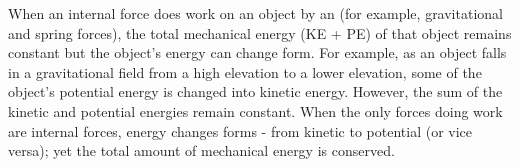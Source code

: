 
%

When an internal force does work on an object by an (for example, gravitational and spring forces), the total mechanical energy (KE + PE) of that object remains constant but the object's energy can change form. For example, as an object falls in a gravitational field from a high elevation to a lower elevation, some of the object's potential energy is changed into kinetic energy. However, the sum of the kinetic and potential energies remain constant. When the only forces doing work are internal forces, energy changes forms - from kinetic to potential (or vice versa); yet the total amount of mechanical energy is conserved.


